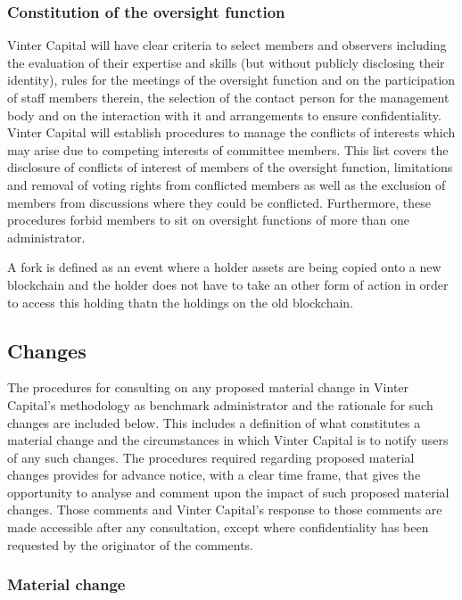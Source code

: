 \documentclass{article}
\begin{document}
\subsubsection{Constitution of the oversight
function}\label{constitution-of-the-oversight-function}

Vinter Capital will have clear criteria to select members and observers
including the evaluation of their expertise and skills (but without
publicly disclosing their identity), rules for the meetings of the
oversight function and on the participation of staff members therein,
the selection of the contact person for the management body and on the
interaction with it and arrangements to ensure confidentiality. Vinter
Capital will establish procedures to manage the conflicts of interests
which may arise due to competing interests of committee members. This
list covers the disclosure of conflicts of interest of members of the
oversight function, limitations and removal of voting rights from
conflicted members as well as the exclusion of members from discussions
where they could be conflicted. Furthermore, these procedures forbid
members to sit on oversight functions of more than one administrator.

A fork is defined as an event where a holder assets are being copied
onto a new blockchain and the holder does not have to take an other form
of action in order to access this holding thatn the holdings on the old
blockchain.

\subsection{Changes}\label{changes}

The procedures for consulting on any proposed material change in Vinter
Capital's methodology as benchmark administrator and the rationale for
such changes are included below. This includes a definition of what
constitutes a material change and the circumstances in which Vinter
Capital is to notify users of any such changes. The procedures required
regarding proposed material changes provides for advance notice, with a
clear time frame, that gives the opportunity to analyse and comment upon
the impact of such proposed material changes. Those comments and Vinter
Capital's response to those comments are made accessible after any
consultation, except where confidentiality has been requested by the
originator of the comments.

\subsubsection{Material change}\label{material-change}
\end{document}
